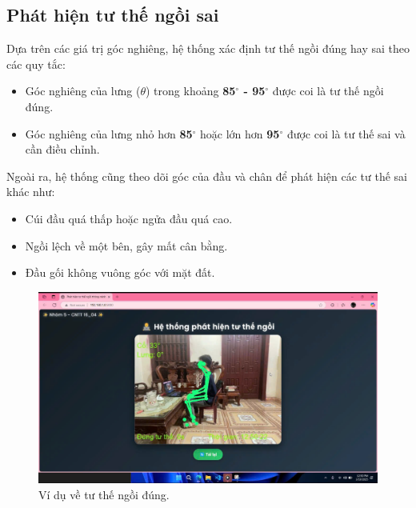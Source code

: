 \documentclass[conference]{IEEEtran}
\begin{document}
\subsection{Phát hiện tư thế ngồi sai}
Dựa trên các giá trị góc nghiêng, hệ thống xác định tư thế ngồi đúng hay sai theo các quy tắc:
\begin{itemize}
    \item Góc nghiêng của lưng (\(\theta\)) trong khoảng \textbf{85$^\circ$ - 95$^\circ$} được coi là tư thế ngồi đúng.
    \item Góc nghiêng của lưng nhỏ hơn \textbf{85$^\circ$} hoặc lớn hơn \textbf{95$^\circ$} được coi là tư thế sai và cần điều chỉnh.
\end{itemize}

Ngoài ra, hệ thống cũng theo dõi góc của đầu và chân để phát hiện các tư thế sai khác như:
\begin{itemize}
    \item Cúi đầu quá thấp hoặc ngửa đầu quá cao.
    \item Ngồi lệch về một bên, gây mất cân bằng.
    \item Đầu gối không vuông góc với mặt đất.
\end{itemize}

\begin{figure}[h]
    \centering
    \includegraphics[width=0.9\linewidth]{images/sitting_posture_correct.png}
    \caption{Ví dụ về tư thế ngồi đúng.}
    \label{fig:sitting_posture_correct}
\end{figure}
\end{document}
